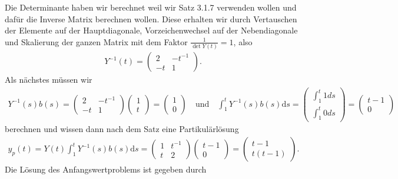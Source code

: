 \begin{solution}
    Die Determinante haben wir berechnet weil wir Satz 3.1.7 verwenden wollen und dafür die Inverse Matrix berechnen wollen. Diese erhalten wir durch Vertauschen der Elemente auf der Hauptdiagonale, Vorzeichenwechsel auf der Nebendiagonale und Skalierung der ganzen Matrix mit dem Faktor $\frac{1}{\det Y(t)} = 1$, also
    \begin{align*}
        Y^{-1}(t) = 
        \begin{pmatrix}
            2 & -t^{-1} \\
            -t & 1
        \end{pmatrix}.
    \end{align*}
    Als nächstes müssen wir
    \begin{align*}
        Y^{-1}(s) b(s) = 
        \begin{pmatrix}
            2 & -t^{-1} \\
            -t & 1
        \end{pmatrix}
        \begin{pmatrix} 1 \\ t \end{pmatrix} =
        \begin{pmatrix} 1 \\ 0 \end{pmatrix} \quad \textrm{und} \quad \int_1^t Y^{-1}(s)b(s) \mathrm{d}s = \begin{pmatrix} \int_1^t 1 ds \\ \int_1^t 0 ds \end{pmatrix} = \begin{pmatrix} t - 1 \\ 0 \end{pmatrix}
    \end{align*}
    berechnen und wissen dann nach dem Satz eine Partikulärlösung
    \begin{align*}
        y_p(t) = Y(t) \int_1^t Y^{-1}(s)b(s) \mathrm{d}s = 
        \begin{pmatrix}
            1 & t^{-1} \\
            t & 2
        \end{pmatrix}
        \begin{pmatrix} t - 1 \\ 0 \end{pmatrix} = \begin{pmatrix} t - 1 \\ t(t - 1) \end{pmatrix}.
    \end{align*}
    Die Lösung des Anfangswertproblems ist gegeben durch

\end{solution}
